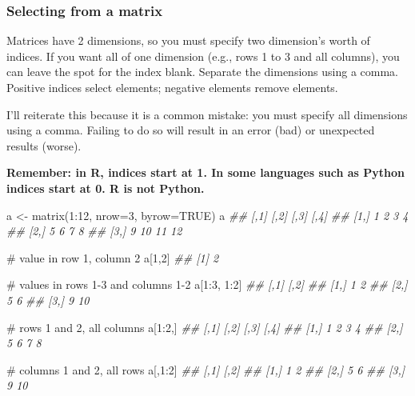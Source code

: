 \documentclass[
  13,
  letterpaper,
]{report}
\newenvironment{Shaded}{\begin{snugshade}}{\end{snugshade}}
\newcommand{\AttributeTok}[1]{\textcolor[rgb]{0.40,0.45,0.13}{#1}}
\newcommand{\CommentTok}[1]{\textcolor[rgb]{0.37,0.37,0.37}{#1}}
\newcommand{\ConstantTok}[1]{\textcolor[rgb]{0.56,0.35,0.01}{#1}}
\newcommand{\DecValTok}[1]{\textcolor[rgb]{0.68,0.00,0.00}{#1}}
\newcommand{\DocumentationTok}[1]{\textcolor[rgb]{0.37,0.37,0.37}{\textit{#1}}}
\newcommand{\FunctionTok}[1]{\textcolor[rgb]{0.28,0.35,0.67}{#1}}
\newcommand{\NormalTok}[1]{\textcolor[rgb]{0.00,0.23,0.31}{#1}}
\newcommand{\OtherTok}[1]{\textcolor[rgb]{0.00,0.23,0.31}{#1}}
\newcommand{\SpecialCharTok}[1]{\textcolor[rgb]{0.37,0.37,0.37}{#1}}
\begin{document}
\subsubsection{Selecting from a matrix}\label{sec-manip-select-bas-mat}

Matrices have 2 dimensions, so you must specify two dimension's worth of
indices. If you want all of one dimension (e.g., rows 1 to 3 and all
columns), you can leave the spot for the index blank. Separate the
dimensions using a comma. Positive indices select elements; negative
elements remove elements.

I'll reiterate this because it is a common mistake: you must specify all
dimensions using a comma. Failing to do so will result in an error (bad)
or unexpected results (worse).

\textbf{Remember: in R, indices start at 1. In some languages such as
Python indices start at 0. R is not Python.}

\begin{Shaded}
\begin{Highlighting}[]

\NormalTok{a }\OtherTok{\textless{}{-}} \FunctionTok{matrix}\NormalTok{(}\DecValTok{1}\SpecialCharTok{:}\DecValTok{12}\NormalTok{, }\AttributeTok{nrow=}\DecValTok{3}\NormalTok{, }\AttributeTok{byrow=}\ConstantTok{TRUE}\NormalTok{)}
\NormalTok{a}
\DocumentationTok{\#\#      [,1] [,2] [,3] [,4]}
\DocumentationTok{\#\# [1,]    1    2    3    4}
\DocumentationTok{\#\# [2,]    5    6    7    8}
\DocumentationTok{\#\# [3,]    9   10   11   12}

\CommentTok{\# value in row 1, column 2}
\NormalTok{a[}\DecValTok{1}\NormalTok{,}\DecValTok{2}\NormalTok{]}
\DocumentationTok{\#\# [1] 2}

\CommentTok{\# values in rows 1{-}3 and columns 1{-}2}
\NormalTok{a[}\DecValTok{1}\SpecialCharTok{:}\DecValTok{3}\NormalTok{, }\DecValTok{1}\SpecialCharTok{:}\DecValTok{2}\NormalTok{]}
\DocumentationTok{\#\#      [,1] [,2]}
\DocumentationTok{\#\# [1,]    1    2}
\DocumentationTok{\#\# [2,]    5    6}
\DocumentationTok{\#\# [3,]    9   10}

\CommentTok{\# rows 1 and 2, all columns}
\NormalTok{a[}\DecValTok{1}\SpecialCharTok{:}\DecValTok{2}\NormalTok{,]}
\DocumentationTok{\#\#      [,1] [,2] [,3] [,4]}
\DocumentationTok{\#\# [1,]    1    2    3    4}
\DocumentationTok{\#\# [2,]    5    6    7    8}

\CommentTok{\# columns 1 and 2, all rows}
\NormalTok{a[,}\DecValTok{1}\SpecialCharTok{:}\DecValTok{2}\NormalTok{]}
\DocumentationTok{\#\#      [,1] [,2]}
\DocumentationTok{\#\# [1,]    1    2}
\DocumentationTok{\#\# [2,]    5    6}
\DocumentationTok{\#\# [3,]    9   10}
\end{Highlighting}
\end{Shaded}
\end{document}
